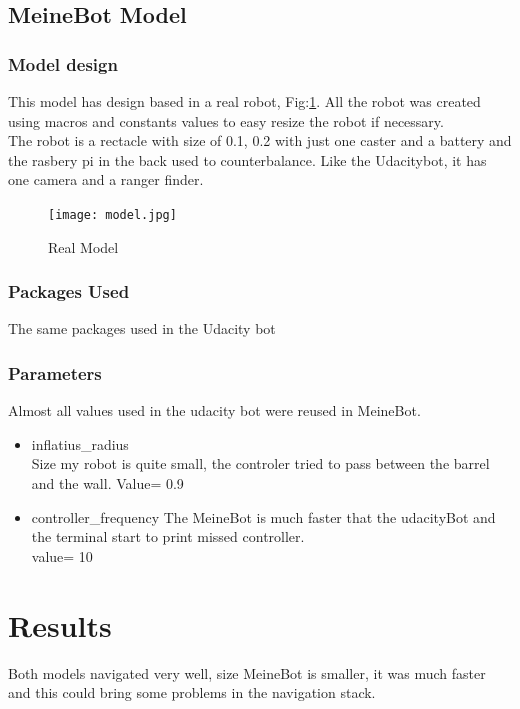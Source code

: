 \documentclass[10pt,journal,compsoc]{IEEEtran}
\begin{document}
\subsection{MeineBot Model}
\subsubsection{Model design}

This model has design based in a real robot, Fig:\ref{fig:model}. All the robot was created using macros and
constants values to easy resize the robot if necessary.\\
The robot is a rectacle with size of 0.1, 0.2 with just one caster and a battery and the rasbery pi in the back used to
counterbalance. Like the Udacitybot, it has one camera and a ranger finder.

\begin{figure}[thpb]
      \centering
      \texttt{[image: model.jpg]}
      \caption{Real Model}
      \label{fig:model}
\end{figure}

\subsubsection{Packages Used}
The same packages used in the Udacity bot
\subsubsection{Parameters}

Almost all values used in the udacity bot were reused in MeineBot.\\
\begin{itemize}
  \item inflatius\_radius\\
    Size my robot is quite small, the controler tried to pass between the barrel and the wall.
    Value= 0.9
   \item controller\_frequency
     The MeineBot is much faster that the udacityBot and the terminal start to print missed controller.\\
     value= 10
\end{itemize}


\section{Results}

Both models navigated very well, size MeineBot is smaller, it was much faster and this could bring some problems in the
navigation stack. 
\end{document}
